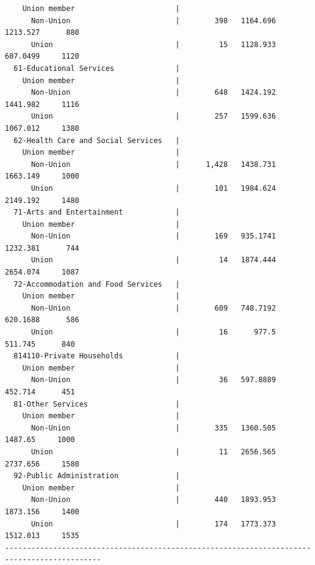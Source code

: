 \documentclass[
]{book}
\begin{document}
\begin{verbatim}
    Union member                       |                                                    
      Non-Union                        |        398   1164.696             1213.527      880
      Union                            |         15   1128.933             607.0499     1120
  61-Educational Services              |                                                    
    Union member                       |                                                    
      Non-Union                        |        648   1424.192             1441.982     1116
      Union                            |        257   1599.636             1067.012     1380
  62-Health Care and Social Services   |                                                    
    Union member                       |                                                    
      Non-Union                        |      1,428   1438.731             1663.149     1000
      Union                            |        101   1984.624             2149.192     1480
  71-Arts and Entertainment            |                                                    
    Union member                       |                                                    
      Non-Union                        |        169   935.1741             1232.381      744
      Union                            |         14   1874.444             2654.074     1087
  72-Accommodation and Food Services   |                                                    
    Union member                       |                                                    
      Non-Union                        |        609   748.7192             620.1688      586
      Union                            |         16      977.5              511.745      840
  814110-Private Households            |                                                    
    Union member                       |                                                    
      Non-Union                        |         36   597.8889              452.714      451
  81-Other Services                    |                                                    
    Union member                       |                                                    
      Non-Union                        |        335   1360.505              1487.65     1000
      Union                            |         11   2656.565             2737.656     1580
  92-Public Administration             |                                                    
    Union member                       |                                                    
      Non-Union                        |        440   1893.953             1873.156     1400
      Union                            |        174   1773.373             1512.013     1535
--------------------------------------------------------------------------------------------
\end{verbatim}
\end{document}
